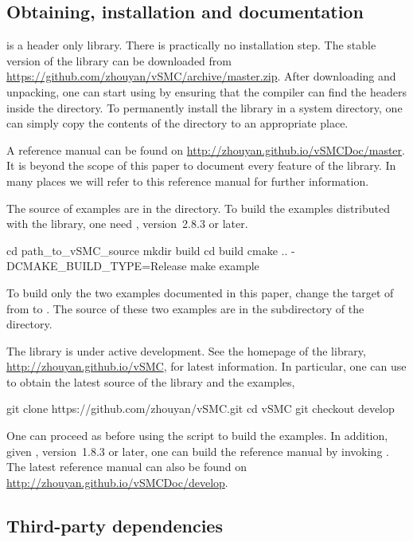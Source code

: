 \documentclass[11pt, fontset=Minion, showoverfull,
bib, mintcode, minted=cache]{marticle}
\begin{document}
\subsection{Obtaining, installation and documentation}

\vsmc is a header only library. There is practically no installation step. The
stable version of the library can be downloaded from
\url{https://github.com/zhouyan/vSMC/archive/master.zip}. After downloading
and unpacking, one can start using \vsmc by ensuring that the compiler can
find the headers inside the  directory. To permanently
install the library in a system directory, one can simply copy the contents of
the  directory to an appropriate place.

A reference manual can be found on
\url{http://zhouyan.github.io/vSMCDoc/master}. It is beyond the scope of this
paper to document every feature of the library. In many places we will refer
to this reference manual for further information.

The source of examples are in the  directory. To build
the examples distributed with the library, one need \fcmake, version~2.8.3 or
later.
\begin{shcode}
cd path_to_vSMC_source
mkdir build
cd build
cmake .. -DCMAKE_BUILD_TYPE=Release
make example
\end{shcode}
To build only the two examples documented in this paper, change the target of
 from  to . The source of
these two examples are in the  subdirectory of the
 directory.

The library is under active development. See the homepage of the library,
\url{http://zhouyan.github.io/vSMC}, for latest information. In particular,
one can use \lgit to obtain the latest source of the library and the examples,
\begin{shcode}
git clone https://github.com/zhouyan/vSMC.git
cd vSMC
git checkout develop
\end{shcode}
One can proceed as before using the \lcmake script to build the examples. In
addition, given \fdoxygen, version~1.8.3 or later, one can build the reference
manual by invoking . The latest reference manual can also
be found on \url{http://zhouyan.github.io/vSMCDoc/develop}.

\subsection{Third-party dependencies}
\end{document}
